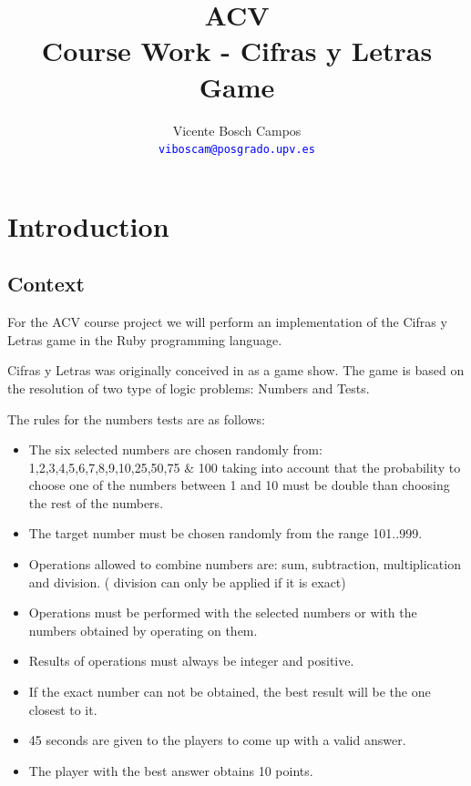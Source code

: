 \documentclass[a4paper,10pt,titlepage]{article}
\title{ACV \\ Course Work - Cifras y Letras Game}
\author{Vicente Bosch Campos \dag \\
\textcolor{blue}{\texttt{viboscam@posgrado.upv.es}}}
\begin{document}
\ifpdf
{}
\else
{}
\fi

\maketitle

\tableofcontents

\listoffigures

\newpage

\section{Introduction}
\subsection{Context}

\par For the ACV course project we will perform an implementation of the Cifras y Letras game in the Ruby programming language.

\par Cifras y Letras was originally conceived in as a game show. The game is based on the resolution of two type of logic problems: Numbers and Tests. 

\par The rules for the numbers tests are as follows:
\begin{itemize}
	\item The six selected numbers are chosen randomly from: 1,2,3,4,5,6,7,8,9,10,25,50,75 \& 100 taking into account that the probability to choose one of the numbers between 1 and 10 must be double than choosing the rest of the numbers.
	\item The target number must be chosen randomly from the range 101..999.
	\item Operations allowed to combine numbers are: sum, subtraction, multiplication and division. ( division can only be applied if it is exact)
	\item Operations must be performed with the selected numbers or with the numbers obtained by operating on them.
	\item Results of operations must always be integer and positive.
	\item If the exact number can not be obtained, the best result will be the one closest to it.
	\item 45 seconds are given to the players to come up with a valid answer.
	\item The player with the best answer obtains 10 points.
\end{itemize}
\end{document}
